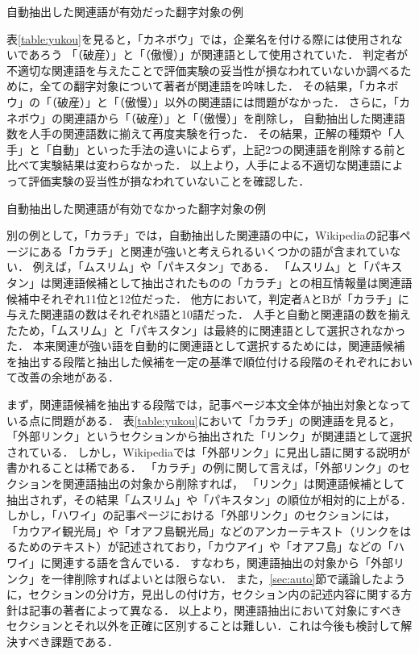 \documentclass[japanese]{jnlp_1.4}
\begin{document}
{\begin{table}[t]
\caption{自動抽出した関連語が有効だった翻字対象の例}
\label{table:yukou}

\end{table}

表\ref{table:yukou}を見ると，「カネボウ」では，企業名を付ける際には使用されないであろう
「（破産）」と「（傲慢）」が関連語として使用されていた．
判定者が不適切な関連語を与えたことで評価実験の妥当性が損なわれていないか調べるために，全ての翻字対象について著者が関連語を吟味した．
その結果，「カネボウ」の\mbox{「（破産）」}と「（傲慢）」以外の関連語には問題がなかった．
さらに，「カネボウ」の関連語から\mbox{「（破産）」}と\mbox{「（傲慢）」}を削除し，
自動抽出した関連語数を人手の関連語数に揃えて再度実験を行った．
その結果，正解の種類や「人手」と「自動」といった手法の違いによらず，上記2つの関連語を削除する前と比べて実験結果は変わらなかった．
以上より，人手による不適切な関連語によって評価実験の妥当性が損なわれていないことを確認した．

\begin{table}[t]
\caption{自動抽出した関連語が有効でなかった翻字対象の例}
\label{table:mukou}

\end{table}

別の例として，\mbox{「カラチ」}では，自動抽出した関連語の中に，\mbox{Wikipedia}の記事ページにある「カラチ」と関連が強いと考えられるいくつかの語が含まれていない．
例えば，「ムスリム」や「パキスタン」である．
「ムスリム」と「パキスタン」は関連語候補として抽出されたものの「カラチ」との相互情報量は関連語候補中それぞれ11位と12位だった．
他方において，判定者AとBが「カラチ」に与えた関連語の数はそれぞれ8語と10語だった．
人手と自動と関連語の数を揃えたため，「ムスリム」と「パキスタン」は最終的に関連語として選択されなかった．
本来関連が強い語を自動的に関連語として選択するためには，関連語候補を抽出する段階と抽出した候補を一定の基準で順位付ける段階のそれぞれにおいて改善の余地がある．

まず，関連語候補を抽出する段階では，記事ページ本文全体が抽出対象となっている点に問題がある．
表\ref{table:yukou}において「カラチ」の関連語を見ると，「外部リンク」というセクションから抽出された「リンク」が関連語として選択されている．
しかし，\mbox{Wikipedia}では\mbox{「外部リンク」}に見出し語に関する説明が書かれることは稀である．
「カラチ」の例に関して言えば，「外部リンク」のセクションを関連語抽出の対象から削除すれば，
\mbox{「リンク」}は関連語候補として抽出されず，その結果「ムスリム」や「パキスタン」の順位が相対的に上がる．
しかし，\mbox{「ハワイ」}の記事ページにおける「外部リンク」のセクションには，
「カウアイ観光局」や「オアフ島観光局」などのアンカーテキスト（リンクをはるためのテキスト）が記述されており，「カウアイ」や「オアフ島」などの「ハワイ」に関連する語を含んでいる．
すなわち，関連語抽出の対象から「外部リンク」を一律削除すればよいとは限らない．
また，\ref{sec:auto}節で議論したように，セクションの分け方，見出しの付け方，セクション内の記述内容に関する方針は記事の著者によって異なる．
以上より，関連語抽出において対象にすべきセクションとそれ以外を正確に区別することは難しい．これは今後も検討して解決すべき課題である．

}
\end{document}
